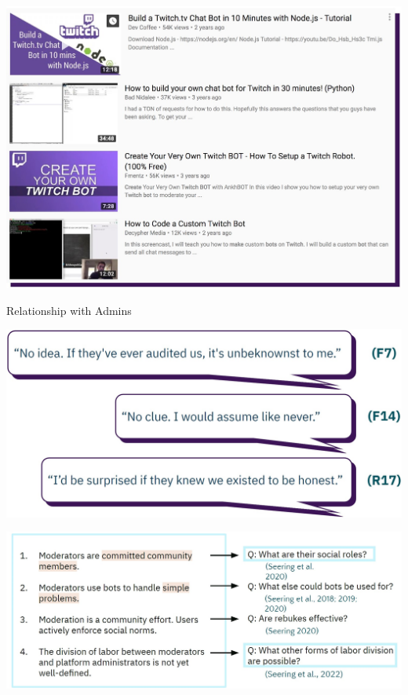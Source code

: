 \documentclass[nobackground,dvipsnames,table]{beamer}
\begin{document}
\begin{frame}{}

\includegraphics[width=\textwidth]{img/fig22.jpg}

\end{frame}

\begin{frame}{Relationship with Admins}

\includegraphics[width=\textwidth]{img/fig23.jpg}

\end{frame}

\begin{frame}{}

\includegraphics[width=\textwidth]{img/fig24.jpg}

\end{frame}
\end{document}
